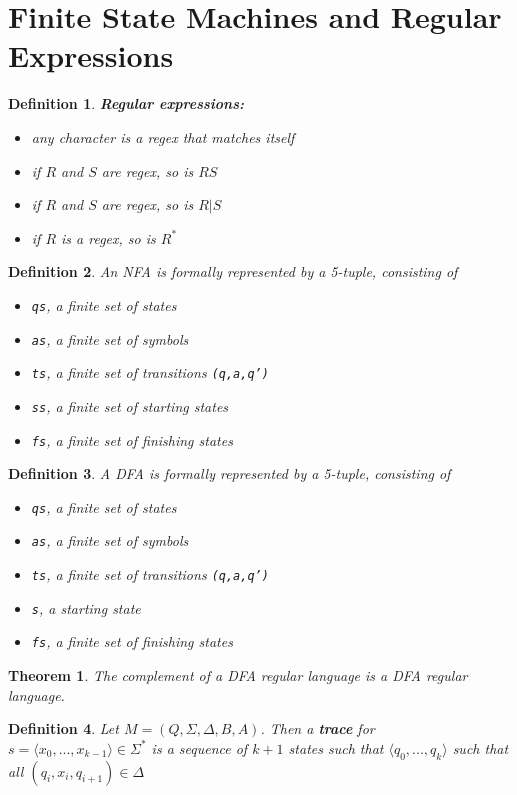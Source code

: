 \documentclass{article}
\theoremstyle{sltheorem}
\newtheorem{definition}{Definition}
\newtheorem{theorem}{Theorem}
\begin{document}
\section{Finite State Machines and Regular Expressions}
\begin{definition}
    \textbf{Regular expressions:}
    \begin{itemize}
        \item any character is a regex that matches itself
        \item if $R$ and $S$ are regex, so is $RS$
        \item if $R$ and $S$ are regex, so is $R|S$
        \item if $R$ is a regex, so is $R^*$
    \end{itemize}
\end{definition}
\begin{definition}
    An NFA is formally represented by a 5-tuple, consisting of
    \begin{itemize}
        \item \texttt{qs}, a finite set of states
        \item \texttt{as}, a finite set of symbols
        \item \texttt{ts}, a finite set of transitions \texttt{(q,a,q')}
        \item \texttt{ss}, a finite set of starting states
        \item \texttt{fs}, a finite set of finishing states
    \end{itemize}
\end{definition}
\begin{definition}
    A DFA is formally represented by a 5-tuple, consisting of
    \begin{itemize}
        \item \texttt{qs}, a finite set of states
        \item \texttt{as}, a finite set of symbols
        \item \texttt{ts}, a finite set of transitions \texttt{(q,a,q')}
        \item \texttt{s}, a starting state
        \item \texttt{fs}, a finite set of finishing states
    \end{itemize}
\end{definition}
\begin{theorem}
    The complement of a DFA regular language is a DFA regular language.
\end{theorem}
\begin{definition}
    Let $M=(Q,\Sigma,\Delta,B,A)$. Then a \textbf{trace} for $s=\langle x_0,...,x_{k-1}\rangle\in\Sigma^*$ is a sequence of $k+1$ states such that $\langle q_0, ...,q_k\rangle$ such that all $(q_i,x_i,q_{i+1})\in\Delta$
\end{definition}
\end{document}
